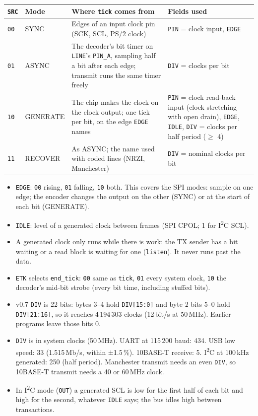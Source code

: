 \documentclass[11pt,a4paper]{article}
\newcommand{\vseven}{\textcolor{sevenc}{\textsf{\small v0.7}}}
\newcommand{\sig}[1]{\texttt{#1}}
\begin{document}
\begin{center}
\small\begin{tabularx}{\linewidth}{@{}l l >{\raggedright\arraybackslash}X >{\raggedright\arraybackslash}X@{}}
\toprule
\sig{SRC} & Mode & Where \sig{tick} comes from & Fields used \\
\midrule
\texttt{00} & SYNC & Edges of an input clock pin (SCK, SCL, PS/2 clock) & \sig{PIN} = clock input, \sig{EDGE} \\
\texttt{01} & ASYNC & The decoder's bit timer on \sig{LINE}'s \sig{PIN\_A}, sampling half a bit after each edge; transmit runs the same timer freely & \sig{DIV} = clocks per bit \\
\texttt{10} & GENERATE & The chip makes the clock on the clock output; one tick per bit, on the edge \sig{EDGE} names & \sig{PIN} = clock read-back input (clock stretching with open drain), \sig{EDGE}, \sig{IDLE}, \sig{DIV} = clocks per half period ($\ge$ 4) \\
\texttt{11} & RECOVER & As ASYNC; the name used with coded lines (NRZI, Manchester) & \sig{DIV} = nominal clocks per bit \\
\bottomrule
\end{tabularx}
\end{center}

\begin{itemize}
\item \sig{EDGE}: \texttt{00} rising, \texttt{01} falling, \texttt{10} both. This covers the SPI modes: sample on one edge; the encoder changes the output on the other (SYNC) or at the start of each bit (GENERATE).
\item \sig{IDLE}: level of a generated clock between frames (SPI CPOL; 1 for I\textsuperscript{2}C SCL).
\item A generated clock only runs while there is work: the TX sender has a bit waiting or a read block is waiting for one (\sig{listen}). It never runs past the data.
\item \sig{ETK} selects \sig{end\_tick}: \texttt{00} same as \sig{tick}, \texttt{01} every system clock, \texttt{10} the decoder's mid-bit strobe (every bit time, including stuffed bits).
\item \vseven{} \sig{DIV} is 22 bits: bytes 3--4 hold \sig{DIV[15:0]} and byte 2 bits 5--0 hold \sig{DIV[21:16]}, so it reaches 4\,194\,303 clocks (12\,bit/s at 50\,MHz). Earlier programs leave those bits 0.
\item \sig{DIV} is in system clocks (50\,MHz). UART at 115\,200 baud: 434. USB low speed: 33 (1.515\,Mb/s, within $\pm$1.5\,\%). 10BASE-T receive: 5. I\textsuperscript{2}C at 100\,kHz generated: 250 (half period). Manchester transmit needs an even \sig{DIV}, so 10BASE-T transmit needs a 40 or 60\,MHz clock.
\item In I\textsuperscript{2}C mode (\sig{OUT}) a generated SCL is low for the first half of each bit and high for the second, whatever \sig{IDLE} says; the bus idles high between transactions.
\end{itemize}
\end{document}
